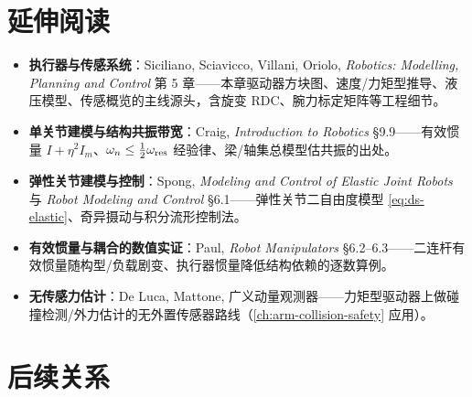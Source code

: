 \section{延伸阅读}
\label{sec:ds-further}

\begin{itemize}
  \item \textbf{执行器与传感系统}：Siciliano, Sciavicco, Villani, Oriolo, \emph{Robotics: Modelling, Planning and Control}\cite{siciliano2009robotics} 第 5 章——本章驱动器方块图、速度/力矩型推导、液压模型、传感概览的主线源头，含旋变 RDC、腕力标定矩阵等工程细节。
  \item \textbf{单关节建模与结构共振带宽}：Craig, \emph{Introduction to Robotics}\cite{craig2005introduction} §9.9——有效惯量 $I+\eta^2 I_m$、$\omega_n\le\tfrac12\omega_{\rm res}$ 经验律、梁/轴集总模型估共振的出处。
  \item \textbf{弹性关节建模与控制}：Spong, \emph{Modeling and Control of Elastic Joint Robots}\cite{spong1987flexible} 与 \emph{Robot Modeling and Control}\cite{spong2006robot} §6.1——弹性关节二自由度模型 \cref{eq:ds-elastic}、奇异摄动与积分流形控制法。
  \item \textbf{有效惯量与耦合的数值实证}：Paul, \emph{Robot Manipulators}\cite{paul1981robot} §6.2--6.3——二连杆有效惯量随构型/负载剧变、执行器惯量降低结构依赖的逐数算例。
  \item \textbf{无传感力估计}：De Luca, Mattone, 广义动量观测器\cite{deluca2003actuator}——力矩型驱动器上做碰撞检测/外力估计的无外置传感器路线（\cref{ch:arm-collision-safety} 应用）。
\end{itemize}

\section{后续关系}
\label{sec:ds-relations}

